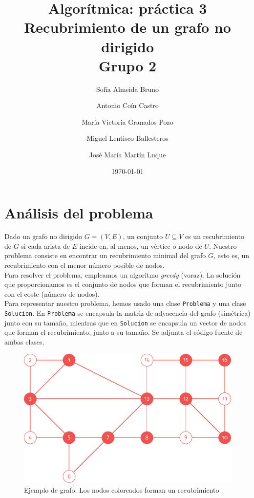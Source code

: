\documentclass[11pt]{article}
\title{Algorítmica: práctica 3 \\ \large Recubrimiento de un grafo no dirigido\\ \vspace{0.2em}Grupo 2}
\author{Sofía Almeida Bruno \and Antonio Coín Castro \and María Victoria Granados Pozo \and Miguel Lentisco Ballesteros \and José María Martín Luque}
\date{\today}
\begin{document}
\maketitle

\newpage

\section*{Análisis del problema}

Dado un grafo no dirigido $G=(V,E)$, un conjunto $U\subseteq V$ es un recubrimiento de $G$ si cada arista de $E$ incide en, al menos, un vértice o nodo de $U$. Nuestro problema consiste en encontrar un recubrimiento minimal del grafo $G$, esto es, un recubrimiento con el menor número posible de nodos. \\

Para resolver el problema, empleamos un algoritmo \textit{greedy} (voraz). La solución que proporcionamos es el conjunto de nodos que forman el recubrimiento junto con el coste (número de nodos). \\

Para representar nuestro problema, hemos usado una clase \verb|Problema| y una clase \verb|Solucion|. En \verb|Problema| se encapsula la matriz de adyacencia del grafo (simétrica) junto con su tamaño, mientras que en \verb|Solucion| se encapsula un vector de nodos que forman el recubrimiento, junto a su tamaño. Se adjunta el código fuente de ambas clases.\\

\begin{figure}[H]
	\caption{Ejemplo de grafo. Los nodos coloreados forman un recubrimiento}
	\centering \includegraphics{./img/grafo.pdf}
\end{figure}
\end{document}

